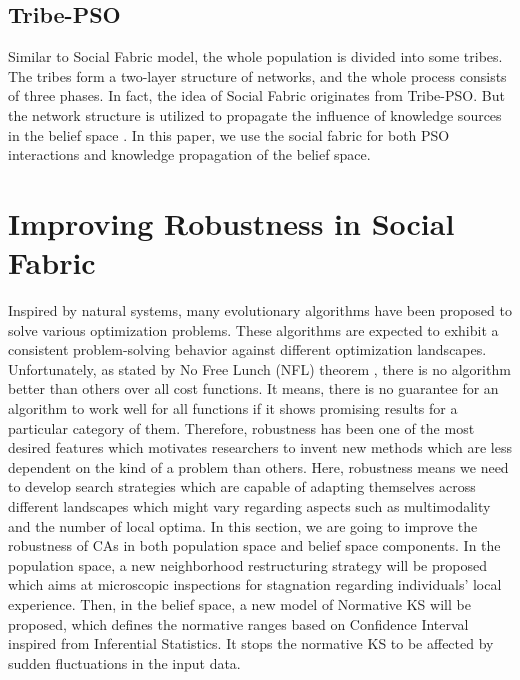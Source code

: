 \documentclass[letterpaper]{article}
\begin{document}
\subsection{Tribe-PSO}
Similar to Social Fabric model, the whole population is divided into some tribes.  The tribes form a two-layer structure of networks, and the whole process consists of three phases. In fact, the idea of Social Fabric originates from Tribe-PSO. But the network structure is utilized to propagate the influence of knowledge sources in the belief space \cite{chen2006tribe}. In this paper, we use the social fabric for both PSO interactions and knowledge propagation of the belief space.
\section{Improving Robustness in Social Fabric}
Inspired by natural systems, many evolutionary algorithms have been proposed to solve various optimization problems. These algorithms are expected to exhibit a consistent problem-solving behavior against different optimization landscapes. Unfortunately, as stated by No Free Lunch (NFL) theorem \cite{wolpert1997no}, there is no algorithm better than others over all cost functions. It means, there is no guarantee for an algorithm to work well for all functions if it shows promising results for a particular category of them. Therefore, robustness has been one of the most desired features which motivates researchers to invent new methods which are less dependent on the kind of a problem than others. Here, robustness means we need to develop search strategies which are capable of adapting themselves across different landscapes which might vary regarding aspects such as multimodality and the number of local optima. 
\newline
In this section, we are going to improve the robustness of CAs in both population space and belief space components. In the population space, a new neighborhood restructuring strategy will be proposed which aims at microscopic inspections for stagnation regarding individuals' local experience. Then, in the belief space, a new model of Normative KS will be proposed, which defines the normative ranges based on Confidence Interval inspired from Inferential Statistics. It stops the normative KS to be affected by sudden fluctuations in the input data.
\end{document}
